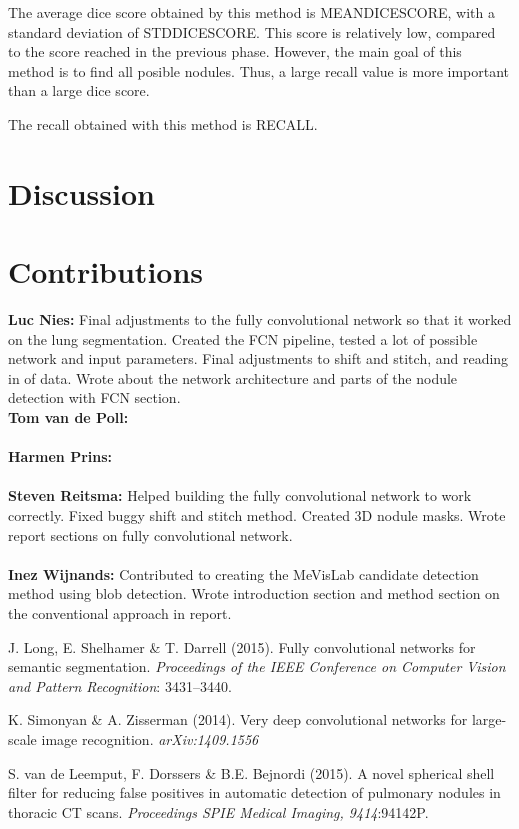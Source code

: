 \documentclass{article}
\begin{document}
The average dice score obtained by this method is MEANDICESCORE, with a standard deviation of STDDICESCORE. This score is relatively low, compared to the score reached in the previous phase. However, the main goal of this method is to find all posible nodules. Thus, a large recall value is more important than a large dice score.

The recall obtained with this method is RECALL.

\section{Discussion}\label{sec:discussion}


\appendix
\section{Contributions}
\textbf{Luc Nies:} Final adjustments to the fully convolutional network so that it worked on the lung segmentation. Created the FCN pipeline, tested a lot of possible network and input parameters. Final adjustments to shift and stitch, and reading in of data. Wrote about the network architecture and parts of the nodule detection with FCN section.
\\
\textbf{Tom van de Poll:} \\
\\
\textbf{Harmen Prins:} \\
\\
\textbf{Steven Reitsma:} Helped building the fully convolutional network to work correctly. Fixed buggy shift and stitch method. Created 3D nodule masks. Wrote report sections on fully convolutional network. \\
\\
\textbf{Inez Wijnands:} Contributed to creating the MeVisLab candidate detection method using blob detection. Wrote introduction section and method section on the conventional approach in report.



\begin{thebibliography}{}
J. Long, E. Shelhamer \& T. Darrell (2015). Fully convolutional networks for semantic segmentation. \emph{Proceedings of the IEEE Conference on Computer Vision and Pattern Recognition}: 3431--3440.

K. Simonyan \& A. Zisserman (2014). Very deep convolutional networks for large-scale image recognition. \emph{arXiv:1409.1556}

S. van de Leemput, F. Dorssers \& B.E. Bejnordi (2015). A novel spherical shell filter for reducing false positives in automatic detection of pulmonary nodules in thoracic CT scans. \emph{Proceedings SPIE Medical Imaging, 9414}:94142P.

\end{thebibliography}
\end{document}
